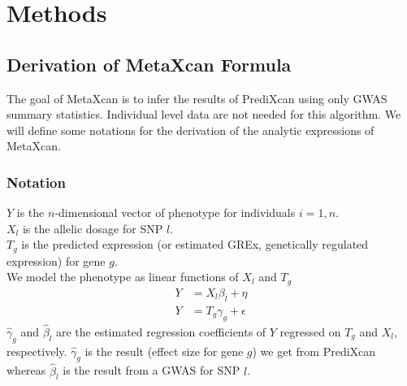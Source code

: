 \documentclass[10pt]{article}
\begin{document}
%



\section*{Methods}

\subsection*{Derivation of MetaXcan Formula}

The goal of MetaXcan is to infer the results of PrediXcan using only GWAS summary statistics. Individual level data are not needed for this algorithm. We will define some notations for the derivation of the analytic expressions of MetaXcan.

\subsubsection*{Notation}

$Y$ is the $n$-dimensional vector of phenotype for individuals $i=1,n$.\\
$X_l$ is the allelic dosage for SNP $l$.\\
$T_g$ is the predicted expression (or estimated GREx, genetically regulated expression) for gene $g$.\\
We model the phenotype as linear functions of $X_l$ and $T_g$
\begin{align*}
Y &= X_l \beta_l + \eta\\
Y &= T_g \gamma_g + \epsilon
\end{align*}
$\hat\gamma_g$ and $\hat\beta_l$ are the estimated regression coefficients of $Y$ regressed on $T_g$ and $X_l$, respectively. $\hat\gamma_g$ is the result (effect size for gene $g$) we get from PrediXcan whereas $\hat\beta_l$ is the result from a GWAS for SNP $l$.
\end{document}

